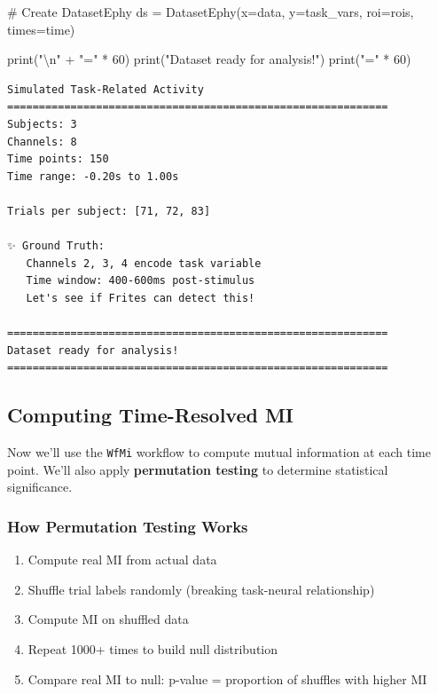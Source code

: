 \documentclass[
  11pt,
  letterpaper,
  oneside,
  openany]{book}
\newenvironment{Shaded}{\begin{snugshade}}{\end{snugshade}}
\newcommand{\BuiltInTok}[1]{\textcolor[rgb]{0.00,0.23,0.31}{#1}}
\newcommand{\CharTok}[1]{\textcolor[rgb]{0.13,0.47,0.30}{#1}}
\newcommand{\CommentTok}[1]{\textcolor[rgb]{0.37,0.37,0.37}{#1}}
\newcommand{\DecValTok}[1]{\textcolor[rgb]{0.68,0.00,0.00}{#1}}
\newcommand{\NormalTok}[1]{\textcolor[rgb]{0.00,0.23,0.31}{#1}}
\newcommand{\OperatorTok}[1]{\textcolor[rgb]{0.37,0.37,0.37}{#1}}
\newcommand{\StringTok}[1]{\textcolor[rgb]{0.13,0.47,0.30}{#1}}
\providecommand{\tightlist}{%
  \setlength{\itemsep}{0pt}\setlength{\parskip}{0pt}}
\begin{document}
\begin{Shaded}
\begin{Highlighting}[]
\CommentTok{\# Create DatasetEphy}
\NormalTok{ds }\OperatorTok{=}\NormalTok{ DatasetEphy(x}\OperatorTok{=}\NormalTok{data, y}\OperatorTok{=}\NormalTok{task\_vars, roi}\OperatorTok{=}\NormalTok{rois, times}\OperatorTok{=}\NormalTok{time)}

\BuiltInTok{print}\NormalTok{(}\StringTok{"}\CharTok{\textbackslash{}n}\StringTok{"} \OperatorTok{+} \StringTok{"="} \OperatorTok{*} \DecValTok{60}\NormalTok{)}
\BuiltInTok{print}\NormalTok{(}\StringTok{"Dataset ready for analysis!"}\NormalTok{)}
\BuiltInTok{print}\NormalTok{(}\StringTok{"="} \OperatorTok{*} \DecValTok{60}\NormalTok{)}
\end{Highlighting}
\end{Shaded}

\begin{verbatim}
Simulated Task-Related Activity
============================================================
Subjects: 3
Channels: 8
Time points: 150
Time range: -0.20s to 1.00s

Trials per subject: [71, 72, 83]

✨ Ground Truth:
   Channels 2, 3, 4 encode task variable
   Time window: 400-600ms post-stimulus
   Let's see if Frites can detect this!

============================================================
Dataset ready for analysis!
============================================================
\end{verbatim}

\subsection{Computing Time-Resolved
MI}\label{computing-time-resolved-mi}

Now we'll use the \texttt{WfMi} workflow to compute mutual information
at each time point. We'll also apply \textbf{permutation testing} to
determine statistical significance.

\subsubsection{How Permutation Testing
Works}\label{how-permutation-testing-works}

\begin{enumerate}
\def\labelenumi{\arabic{enumi}.}
\tightlist
\item
  Compute real MI from actual data
\item
  Shuffle trial labels randomly (breaking task-neural relationship)
\item
  Compute MI on shuffled data
\item
  Repeat 1000+ times to build null distribution
\item
  Compare real MI to null: p-value = proportion of shuffles with higher
  MI
\end{enumerate}
\end{document}
